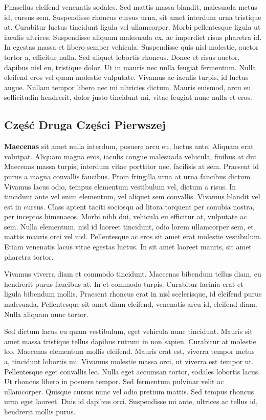 \documentclass[]{article}
\begin{document}
Phasellus eleifend venenatis sodales. Sed mattis massa blandit, malesuada metus id, cursus sem. Suspendisse rhoncus cursus urna, sit amet interdum urna tristique at. Curabitur luctus tincidunt ligula vel ullamcorper. Morbi pellentesque ligula ut iaculis ultrices. Suspendisse aliquam malesuada ex, ac imperdiet risus pharetra id. In egestas massa et libero semper vehicula. Suspendisse quis nisl molestie, auctor tortor a, efficitur nulla. Sed aliquet lobortis rhoncus. Donec et risus auctor, dapibus nisl eu, tristique dolor. Ut in mauris nec nulla feugiat fermentum. Nulla eleifend eros vel quam molestie vulputate. Vivamus ac iaculis turpis, id luctus augue. Nullam tempor libero nec mi ultricies dictum. Mauris euismod, arcu eu sollicitudin hendrerit, dolor justo tincidunt mi, vitae feugiat nunc nulla et eros.
\newpage
\subsection{Część Druga Części Pierwszej}
\textbf{Maecenas} \cite{drugi} sit amet nulla interdum, posuere arcu eu, luctus ante. Aliquam erat volutpat. Aliquam magna eros, iaculis congue malesuada vehicula, finibus at dui. Maecenas massa turpis, interdum vitae porttitor nec, facilisis at sem. Praesent id purus a magna convallis faucibus. Proin fringilla urna at urna faucibus dictum. Vivamus lacus odio, tempus elementum vestibulum vel, dictum a risus. In tincidunt ante vel enim elementum, vel aliquet sem convallis. Vivamus blandit vel est in cursus. Class aptent taciti sociosqu ad litora torquent per conubia nostra, per inceptos himenaeos. Morbi nibh dui, vehicula eu efficitur at, vulputate ac sem. Nulla elementum, nisl id laoreet tincidunt, odio lorem ullamcorper sem, et mattis mauris orci vel nisl. Pellentesque ac eros sit amet erat molestie vestibulum. Etiam venenatis lacus vitae egestas luctus. In sit amet laoreet mauris, sit amet pharetra tortor.

Vivamus viverra diam et commodo tincidunt. Maecenas bibendum tellus diam, eu hendrerit purus faucibus at. In et commodo turpis. Curabitur lacinia erat et ligula bibendum mollis. Praesent rhoncus erat in nisl scelerisque, id eleifend purus malesuada. Pellentesque sit amet diam eleifend, venenatis arcu id, eleifend diam. Nulla aliquam nunc tortor.

Sed dictum lacus eu quam vestibulum, eget vehicula nunc tincidunt. Mauris sit amet massa tristique tellus dapibus rutrum in non sapien. Curabitur at molestie leo. Maecenas elementum mollis eleifend. Mauris erat est, viverra tempor metus a, tincidunt lobortis mi. Vivamus molestie massa orci, ut viverra est tempor ut. Pellentesque eget convallis leo. Nulla eget accumsan tortor, sodales lobortis lacus. Ut rhoncus libero in posuere tempor. Sed fermentum pulvinar velit ac ullamcorper. Quisque cursus nunc vel odio pretium mattis. Sed tempus rhoncus urna eget laoreet. Duis id dapibus orci. Suspendisse mi ante, ultrices ac tellus id, hendrerit mollis purus.
\end{document}
